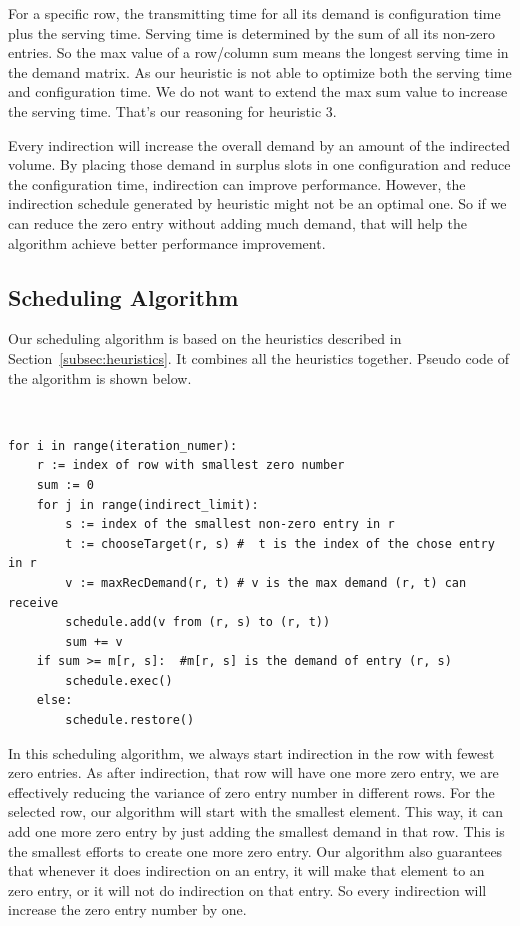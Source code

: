 For a specific row, the transmitting time for all its demand is configuration time plus the serving time. Serving time is determined by the sum of all its non-zero entries. So the max value of a row/column sum means the longest serving time in the demand matrix. As our heuristic is not able to optimize both the serving time and configuration time. We do not want to extend the max sum value to increase the serving time. That's our reasoning for heuristic 3.

Every indirection will increase the overall demand by an amount of the indirected volume. By placing those demand in surplus slots in one configuration and reduce the configuration time, indirection can improve performance. However, the indirection schedule generated by heuristic might not be an optimal one. So if we can reduce the zero entry without adding much demand, that will help the algorithm achieve better performance improvement. 

\subsection{Scheduling Algorithm}
\label{subsec:algorithm}
Our scheduling algorithm is based on the heuristics described in Section~\ref{subsec:heuristics}. It combines all the heuristics together. Pseudo code of the algorithm is shown below. 

{\tt \small
\begin{verbatim}
for i in range(iteration_numer):
    r := index of row with smallest zero number
    sum := 0
    for j in range(indirect_limit):
        s := index of the smallest non-zero entry in r
        t := chooseTarget(r, s) #  t is the index of the chose entry in r
        v := maxRecDemand(r, t) # v is the max demand (r, t) can receive
        schedule.add(v from (r, s) to (r, t))
        sum += v
    if sum >= m[r, s]:  #m[r, s] is the demand of entry (r, s)
        schedule.exec()
    else:
        schedule.restore()
\end{verbatim}
}

In this scheduling algorithm, we always start indirection in the row with fewest zero entries. As after indirection, that row will have one more zero entry, we are effectively reducing the variance of zero entry number in different rows. For the selected row, our algorithm will start with the smallest element. This way, it can add one more zero entry by just adding the smallest demand in that row. This is the smallest efforts to create one more zero entry. Our algorithm also guarantees that whenever it does indirection on an entry, it will make that element to an zero entry, or it will not do indirection on that entry. So every indirection will increase the zero entry number by one.


